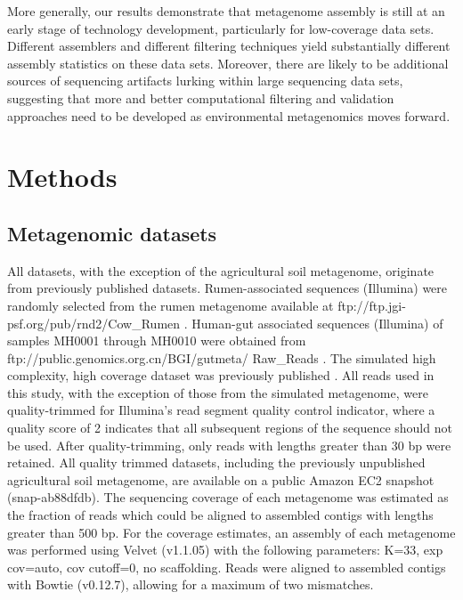 \documentclass[10pt]{article}
\begin{document}
More generally, our results demonstrate that metagenome assembly is
still at an early stage of technology development, particularly for
low-coverage data sets.  Different assemblers and different filtering
techniques yield substantially different assembly statistics on these
data sets.  Moreover, there are likely to be additional sources of
sequencing artifacts lurking within large sequencing data sets,
suggesting that more and better computational filtering and validation
approaches need to be developed as environmental metagenomics moves
forward.

\section*{Methods}

\subsection*{Metagenomic datasets}
All datasets, with the exception of the agricultural soil metagenome,
originate from previously published datasets. Rumen-associated
sequences (Illumina) were randomly selected from the rumen metagenome
available at ftp://ftp.jgi-psf.org/pub/rnd2/Cow\_Rumen
\cite{Hess:2011p686}. Human-gut associated sequences (Illumina) of
samples MH0001 through MH0010 were obtained from
ftp://public.genomics.org.cn/BGI/gutmeta/ Raw\_Reads
\cite{Qin:2010p189}.  The simulated high complexity, high coverage
dataset was previously published \cite{Pignatelli:2011p742}.  All
reads used in this study, with the exception of those from the simulated
metagenome, were quality-trimmed for Illumina's read segment quality
control indicator, where a quality score of 2 indicates that all
subsequent regions of the sequence should not be used. After
quality-trimming, only reads with lengths greater than 30 bp were
retained. All quality trimmed datasets, including the previously
unpublished agricultural soil metagenome, are available on a public
Amazon EC2 snapshot (snap-ab88dfdb).  The sequencing coverage of each
metagenome was estimated as the fraction of reads which could be
aligned to assembled contigs with lengths greater than 500 bp.  For
the coverage estimates, an assembly of each metagenome was performed
using Velvet (v1.1.05) with the following parameters: K=33, exp
cov=auto, cov cutoff=0, no scaffolding.  Reads were aligned to
assembled contigs with Bowtie (v0.12.7), allowing for a maximum of two
mismatches.
\end{document}
